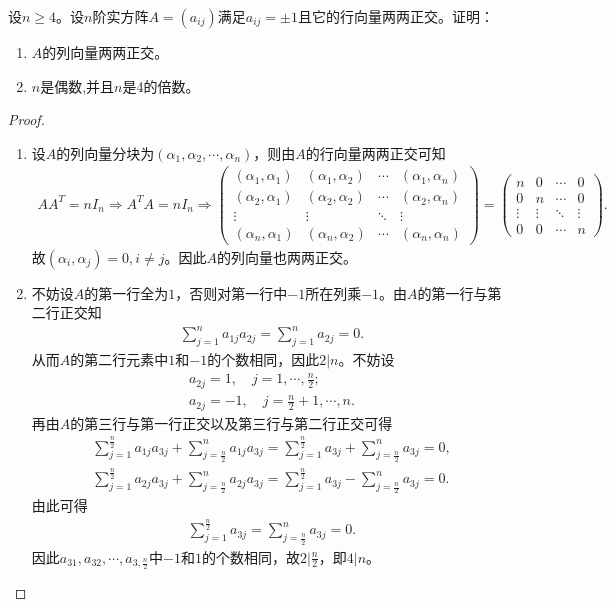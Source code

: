 \documentclass[../../main.tex]{subfiles}%
\begin{document}
\begin{example}
设$n \geqslant 4$。设$n$阶实方阵$A = (a_{ij})$满足$a_{ij} = \pm 1$且它的行向量两两正交。证明：
\begin{enumerate}[(1)]
\item $A$的列向量两两正交。

\item $n$是偶数,并且$n$是4的倍数。
\end{enumerate}
\end{example}
\begin{proof}
\begin{enumerate}[(1)]
\item 设$A$的列向量分块为$(\alpha_1,\alpha_2,\cdots,\alpha_n)$，则由$A$的行向量两两正交可知
\begin{align*}
AA^T=nI_n\Longrightarrow A^TA=nI_n\Longrightarrow \begin{pmatrix}
(\alpha_1,\alpha_1) & (\alpha_1,\alpha_2) & \cdots & (\alpha_1,\alpha_n) \\
(\alpha_2,\alpha_1) & (\alpha_2,\alpha_2) & \cdots & (\alpha_2,\alpha_n) \\
\vdots & \vdots & \ddots & \vdots \\
(\alpha_n,\alpha_1) & (\alpha_n,\alpha_2) & \cdots & (\alpha_n,\alpha_n)
\end{pmatrix} = \begin{pmatrix}
n & 0 & \cdots & 0 \\
0 & n & \cdots & 0 \\
\vdots & \vdots & \ddots & \vdots \\
0 & 0 & \cdots & n
\end{pmatrix}.
\end{align*}
故$(\alpha_i,\alpha_j)=0,i\ne j$。因此$A$的列向量也两两正交。

\item 不妨设$A$的第一行全为$1$，否则对第一行中$-1$所在列乘$-1$。由$A$的第一行与第二行正交知
\begin{align*}
\sum_{j=1}^n a_{1j}a_{2j} = \sum_{j=1}^n a_{2j} = 0.
\end{align*}
从而$A$的第二行元素中$1$和$-1$的个数相同，因此$2|n$。不妨设
\begin{gather*}
a_{2j}=1,\quad j=1,\cdots,\frac{n}{2}; \\
a_{2j}=-1,\quad j=\frac{n}{2}+1,\cdots,n.
\end{gather*}
再由$A$的第三行与第一行正交以及第三行与第二行正交可得
\begin{align*}
\sum_{j=1}^{\frac{n}{2}} a_{1j}a_{3j} + \sum_{j=\frac{n}{2}}^n a_{1j}a_{3j} = \sum_{j=1}^{\frac{n}{2}} a_{3j} + \sum_{j=\frac{n}{2}}^n a_{3j} = 0, \\
\sum_{j=1}^{\frac{n}{2}} a_{2j}a_{3j} + \sum_{j=\frac{n}{2}}^n a_{2j}a_{3j} = \sum_{j=1}^{\frac{n}{2}} a_{3j} - \sum_{j=\frac{n}{2}}^n a_{3j} = 0.
\end{align*}
由此可得
\begin{align*}
\sum_{j=1}^{\frac{n}{2}} a_{3j} = \sum_{j=\frac{n}{2}}^n a_{3j} = 0.
\end{align*}
因此$a_{31},a_{32},\cdots,a_{3,\frac{n}{2}}$中$-1$和$1$的个数相同，故$2|\frac{n}{2}$，即$4|n$。
\end{enumerate}

\end{proof}
\end{document}
